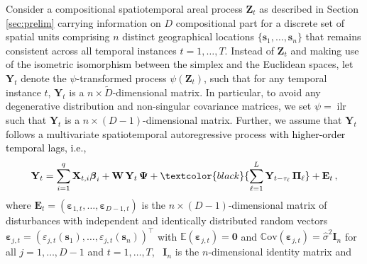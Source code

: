 \documentclass[12pt]{article}
\theoremstyle{plain}
\theoremstyle{definition}
\newcommand{\e}{\mathds{E}}
\newcommand{\cov}{\mathds{C}\text{ov}}
\newcommand{\xvec}{\boldsymbol}
\newcommand{\xmat}{\mathbf}
\DeclareMathOperator{\ilr}{ilr}
\begin{document}
Consider a compositional spatiotemporal areal process $\xmat{Z}_t$ as described in Section \ref{sec:prelim} carrying information on $D$ compositional part for a discrete set of spatial units comprising $n$ distinct geographical locations $\{\xvec{s}_1, \ldots, \xvec{s}_n\}$ that remains consistent across all temporal instances $t = 1, \ldots, T$. Instead of $\xmat{Z}_t$ and making use of the isometric isomorphism between the simplex and the Euclidean spaces, let $\xmat{Y}_t$ denote the $\psi$-transformed process $\psi(\xmat{Z}_t)$, such that for any temporal instance $t$, $\xvec{Y}_t$ is a $n \times \tilde{D}$-dimensional matrix. In particular, to avoid any degenerative distribution and non-singular covariance matrices, we set $\psi=\ilr$ such that  $\xmat{Y}_t$ is a $n \times (D-1)$-dimensional matrix. Further, we assume that $\xmat{Y}_t$ follows a multivariate spatiotemporal autoregressive process \textcolor{black}{with higher-order temporal lags, i.e.,}
\begin{equation} \label{eq:initial2}
\xmat{Y}_t  =  \sum_{i=1}^{q}\xmat{X}_{t,i}\xvec{\beta}_i + \xmat{W}  \, \xmat{Y}_t \,  \xmat{\Psi}  +  \textcolor{black}{\sum_{\ell = 1}^{L} \xmat{Y}_{t-{\tau_\ell}} \,  \xmat{\Pi}_\ell} + \xmat{E}_t\, ,
\end{equation}
where $\xmat{E}_t = (\xvec{\varepsilon}_{1,t}, \ldots, \xvec{\varepsilon}_{D-1,t})$ is the $n \times (D-1)$-dimensional matrix of disturbances with independent and identically distributed random vectors $\xvec{\varepsilon}_{j,t} = (\varepsilon_{j,t}(\xvec{s}_1), \ldots, \varepsilon_{j,t}(\xvec{s}_n))^\top$ with $\e(\xvec{\varepsilon}_{j,t}) = \xvec{0}$ and $\cov(\xvec{\varepsilon}_{j,t}) = \hat{\sigma}^2 \xmat{I}_n$ for all $j = 1,\ldots, D-1$ and $t = 1,\ldots, T$,~ $\xmat{I}_n$ is the $n$-dimensional identity matrix and  %
\end{document}
